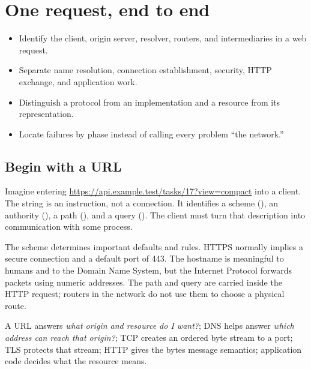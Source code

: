 \chapter{One request, end to end}

\begin{objectives}
\begin{itemize}
  \item Identify the client, origin server, resolver, routers, and intermediaries in a web request.
  \item Separate name resolution, connection establishment, security, HTTP exchange, and application work.
  \item Distinguish a protocol from an implementation and a resource from its representation.
  \item Locate failures by phase instead of calling every problem ``the network.''
\end{itemize}
\end{objectives}

\section{Begin with a URL}

Imagine entering \url{https://api.example.test/tasks/17?view=compact} into a
client. The string is an instruction, not a connection. It identifies a scheme
(), an authority (), a path
(), and a query (). The client must turn that
description into communication with some process.

The scheme determines important defaults and rules. HTTPS normally implies a
secure connection and a default port of 443. The hostname is meaningful to
humans and to the Domain Name System, but the Internet Protocol forwards
packets using numeric addresses. The path and query are carried inside the HTTP
request; routers in the network do not use them to choose a physical route.

\begin{mentalmodel}
A URL answers \emph{what origin and resource do I want?}; DNS helps answer
\emph{which address can reach that origin?}; TCP creates an ordered byte
stream to a port; TLS protects that stream; HTTP gives the bytes message
semantics; application code decides what the resource means.
\end{mentalmodel}

